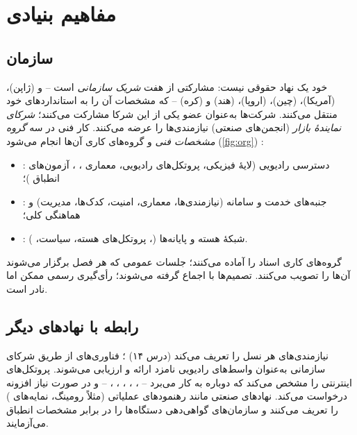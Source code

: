 \documentclass[11pt,a4paper]{article}
\begin{document}
\section{مفاهیم بنیادی}

\subsection{سازمان}
 خود یک نهاد حقوقی نیست: مشارکتی از هفت \emph{شریک سازمانی} است --  و  (ژاپن)، 
(آمریکا)،  (چین)،  (اروپا)،  (هند) و  (کره) -- که مشخصات آن را به استانداردهای خود
منتقل می‌کنند. شرکت‌ها به‌عنوان عضو یکی از این شرکا مشارکت می‌کنند؛ \emph{شرکای نمایندهٔ بازار} (انجمن‌های صنعتی)
نیازمندی‌ها را عرضه می‌کنند. کار فنی در سه \emph{گروه مشخصات فنی} و گروه‌های کاری آن‌ها انجام می‌شود (\cref{fig:org})
\cite{tr21900}:
\begin{itemize}
  \item \textbf{}: دسترسی رادیویی (لایهٔ فیزیکی، پروتکل‌های رادیویی، معماری ، ، آزمون‌های
        انطباق )؛
  \item \textbf{}: جنبه‌های خدمت و سامانه (نیازمندی‌ها، معماری، امنیت، کدک‌ها، مدیریت) و هماهنگی کلی؛
  \item \textbf{}: شبکهٔ هسته و پایانه‌ها (، پروتکل‌های هسته، سیاست، ).
\end{itemize}
گروه‌های کاری اسناد را آماده می‌کنند؛ جلسات عمومی  که هر فصل برگزار می‌شوند آن‌ها را تصویب می‌کنند. تصمیم‌ها با
اجماع گرفته می‌شوند؛ رأی‌گیری رسمی ممکن اما نادر است.

\begin{acnfigure}
  \caption{سازمان : شرکای سازمانی، هماهنگی پروژه، ها و گروه‌های کاری آن‌ها (گزیده).}
  \label{fig:org}
\end{acnfigure}

\subsection{رابطه با نهادهای دیگر}
 نیازمندی‌های هر نسل  را تعریف می‌کند (درس ۱۴) \cite{itu2017m2410,itu2023m2160}؛ فناوری‌های  از
طریق شرکای سازمانی به‌عنوان واسط‌های رادیویی نامزد  ارائه و ارزیابی می‌شوند.  پروتکل‌های اینترنتی را
مشخص می‌کند که  دوباره به کار می‌برد -- ، ، ، ، ،
 \cite{rfc6733,rfc9113,rfc9260,rfc3261} -- و  در صورت نیاز افزونه درخواست می‌کند. نهادهای صنعتی مانند
 رهنمودهای عملیاتی (مثلاً رومینگ، نمایه‌های ) را تعریف می‌کنند و سازمان‌های گواهی‌دهی دستگاه‌ها را
در برابر مشخصات انطباق  می‌آزمایند.
\end{document}
